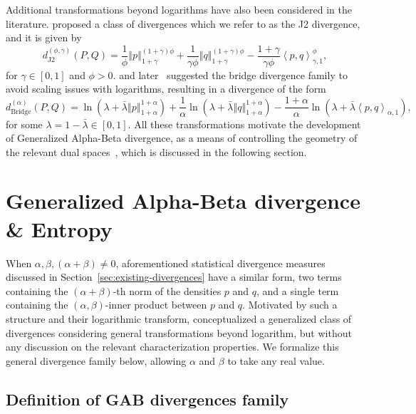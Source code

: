 \documentclass[11pt]{article}
\theoremstyle{plain}
\theoremstyle{remark}
\newcommand{\norm}[1]{\left\Vert #1 \right\Vert}
\newcommand{\inner}[1]{\left\langle #1\right\rangle}
\begin{document}
Additional transformations beyond logarithms have also been considered in the literature. \cite{jones2001comparison} proposed a class of divergences which we refer to as the J2 divergence, and it is given by
\begin{equation*}
    d_{\mathrm{J2}}^{(\phi, \gamma)}(P, Q) = \frac{1}{\phi}\norm{p}_{1+\gamma}^{(1+\gamma)\phi} + \frac{1}{\gamma\phi}\norm{q}_{1+\gamma}^{(1+\gamma)\phi} - \frac{1+\gamma}{\gamma\phi} \inner{p,q}_{\gamma,1}^\phi,
\end{equation*}
\noindent for $\gamma \in [0, 1]$ and $\phi > 0$. \cite{kuchibhotla2019statistical} and later~\cite{gayen2024unified} suggested the bridge divergence family to avoid scaling issues with logarithms, resulting in a divergence of the form
\begin{equation*}
    d_{\mathrm{Bridge}}^{(\alpha)}(P, Q) = \ln(\lambda + \bar{\lambda} \norm{p}_{1+\alpha}^{1+\alpha}) + \frac{1}{\alpha} \ln(\lambda + \bar{\lambda} \norm{q}_{1+\alpha}^{1+\alpha}) - \frac{1+\alpha}{\alpha} \ln(\lambda + \bar{\lambda} \inner{p,q}_{\alpha,1}),
\end{equation*}
\noindent for some $\lambda = 1 - \bar{\lambda} \in [0, 1]$. All these transformations motivate the development of Generalized Alpha-Beta divergence, as a means of controlling the geometry of the relevant dual spaces~\citep{amari2010information}, which is discussed in the following section.


\section{Generalized Alpha-Beta divergence \& Entropy}\label{sec:gsd-alpha-beta}

When $\alpha, \beta, (\alpha+\beta) \neq 0$, aforementioned statistical divergence measures discussed in Section~\ref{sec:existing-divergences} have a similar form, two terms containing the $(\alpha+\beta)$-th norm of the densities $p$ and $q$, and a single term containing the $(\alpha,\beta)$-inner product between $p$ and $q$. Motivated by such a structure and their logarithmic transform, \cite{maji2019contributions} conceptualized a generalized class of divergences considering general transformations beyond logarithm, but without any discussion on the relevant characterization properties. We formalize this general divergence family below, allowing $\alpha$ and $\beta$ to take any real value.

\subsection{Definition of GAB divergences family}\label{sec:gab-defn}
\end{document}
